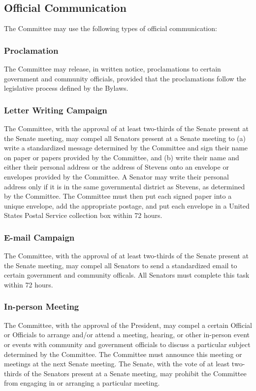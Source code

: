 \documentclass[12pt]{scrreprt}
\begin{document}
\subsection{Official Communication}
The Committee may use the following types of official communication:
\subsubsection{Proclamation}
The Committee may release, in written notice, proclamations to certain
government and community officials, provided that the proclamations
follow the legislative process defined by the Bylaws.
\subsubsection{Letter Writing Campaign}
The Committee, with the approval of at least two-thirds of the Senate
present at the Senate meeting, may compel all Senators present at a
Senate meeting to (a) write a standardized message determined by the
Committee and sign their name on paper or papers provided by the
Committee, and (b) write their name and either their personal address or
the address of Stevens onto an envelope or envelopes provided by the
Committee. A Senator may write their personal address only if it is in the
same governmental district as Stevens, as determined by the
Committee. The Committee must then put each signed paper into a
unique envelope, add the appropriate postage, and put each envelope in
a United States Postal Service collection box within 72 hours.
\subsubsection{E-mail Campaign}
The Committee, with the approval of at least two-thirds of the Senate
present at the Senate meeting, may compel all Senators to send a
standardized email to certain government and community officals. All
Senators must complete this task within 72 hours.
\subsubsection{In-person Meeting}
The Committee, with the approval of the President, may compel a certain
Official or Officials to arrange and/or attend a meeting, hearing, or other
in-person event or events with community and government officials to
discuss a particular subject determined by the Committee. The
Committee must announce this meeting or meetings at the next Senate
meeting. The Senate, with the vote of at least two-thirds of the Senators
present at a Senate meeting, may prohibit the Committee from engaging
in or arranging a particular meeting.
\end{document}
